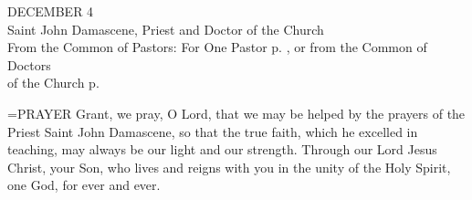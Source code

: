 \begin{center}\normalsize DECEMBER 4\\
\footnotesize Saint John Damascene, Priest and Doctor of the Church\\
\footnotesize From the Common of Pastors: For One Pastor p.   , or from the Common of Doctors\\
\footnotesize of the Church p.\\
\end{center}

\hangindent=\parindent \small{PRAYER 
Grant, we pray, O Lord,
that we may be helped by the prayers
of the Priest Saint John Damascene,
so that the true faith,
which he excelled in teaching,
may always be our light and our strength.
Through our Lord Jesus Christ, your Son,
who lives and reigns with you in the unity of the Holy Spirit,
one God, for ever and ever.\\}
 
